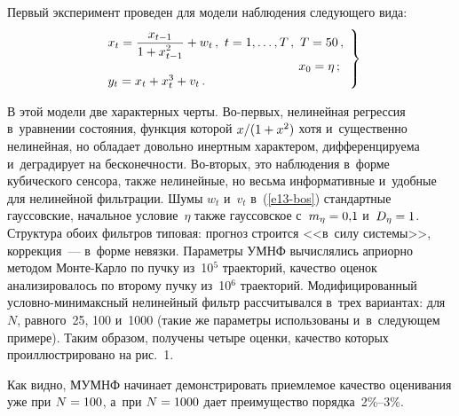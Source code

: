 \begin{multicols}{2}
    
    Первый эксперимент проведен для модели наблюдения следующего вида:
    \begin{equation}
    \left.
    \begin{array}{l}
    x_t=\fr{x_{t-1}}{1+x^2_{t-1}}+w_t\,,\ t=1,\ldots, T\,,\ T=50\,,\\
\hspace*{54mm}x_0=\eta\,;\\
    y_t=x_t+x_t^3+v_t\,.
    \end{array}
    \right\}
    \label{e13-bos}
    \end{equation}
    
    В этой модели две характерных черты. Во-пер\-вых, нелинейная регрессия 
    в~уравнении состояния, функция которой $x/(1\hm+x^2)$ хотя и~существенно 
нелинейная, но обладает довольно инертным характером, дифференцируема 
и~деградирует на бесконечности. Во-вто\-рых, это наблюдения в~форме 
кубического сенсора, также нелинейные, но весьма информативные и~удобные 
для нелинейной фильт\-ра\-ции. Шумы $w_t$ и~$v_t$ в~(\ref{e13-bos}) стандартные 
гауссовские, начальное условие~$\eta$ также гауссовское с~$m_\eta\hm= 
0{,}1$ и~$D_\eta\hm=1$. Структура обоих фильт\-ров типовая: прогноз строится 
<<в~силу сис\-те\-мы>>, коррекция~--- в~форме невязки. Параметры УМНФ 
вы\-чис\-ля\-лись априорно методом Мон\-те-Кар\-ло по пучку из~10$^5$ 
траекторий, качество оценок анализировалось по второму пучку из~10$^6$ 
траекторий. Модифицированный услов\-но-ми\-ни\-макс\-ный нелинейный
фильтр рассчитывался в~трех вариантах: для~$N$, равного~25, 
100 и~1000 (такие же па\-ра\-мет\-ры использованы и~в~следующем примере). Таким 
образом, получены четыре оценки, качество которых проиллюстрировано на 
рис.~1.
    
    
     
    
    Как видно, МУМНФ начинает демонстрировать приемлемое качество 
оценивания уже при $N\hm=100$,  а~при $N\hm=1000$ дает преимущество 
порядка~2\%--3\%.
{ %

}


\end{multicols}
